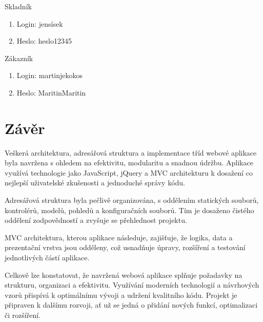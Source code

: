 \documentclass[12pt, a4paper]{report}
\begin{document}
Skladník
\begin{enumerate}[left=1cm]
    \item Login: jensísek
    \item Heslo: heslo12345
\end{enumerate}

Zákazník
\begin{enumerate}[left=1cm]
    \item Login: martinjekokos
    \item Heslo: MaritinMaritin
\end{enumerate}

\section{Závěr}
Veškerá architektura, adresářová struktura a implementace tříd webové aplikace byla navržena s ohledem na efektivitu, modularitu a snadnou údržbu. Aplikace využívá technologie jako JavaScript, jQuery a MVC architekturu k dosažení co nejlepší uživatelské zkušenosti a jednoduché správy kódu.

Adresářová struktura byla pečlivě organizována, s oddělením statických souborů, kontrolérů, modelů, pohledů a konfiguračních souborů. Tím je dosaženo čistého oddělení zodpovědností a zvyšuje se přehlednost projektu.

MVC architektura, kterou aplikace následuje, zajišťuje, že logika, data a prezentační vrstva jsou odděleny, což usnadňuje úpravy, rozšíření a testování jednotlivých částí aplikace.

Celkově lze konstatovat, že navržená webová aplikace splňuje požadavky na strukturu, organizaci a efektivitu. Využívání moderních technologií a návrhových vzorů přispívá k optimálnímu vývoji a udržení kvalitního kódu. Projekt je připraven k dalšímu rozvoji, ať už se jedná o přidání nových funkcí, optimalizaci či rozšíření.
\end{document}
